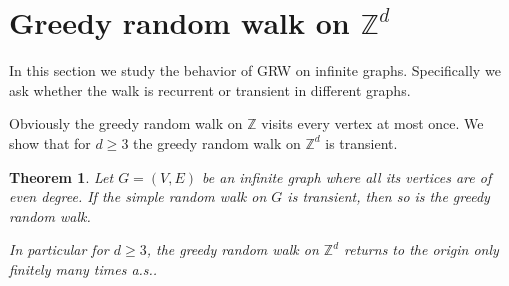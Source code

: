 \documentclass[12pt,a4paper]{article}
\newcommand{\0}{{\bf 0}}
\newcommand{\Z}{{\mathbb Z}}
\newtheorem{theorem}{Theorem}[section]
\begin{document}
\section{Greedy random walk on $\Z^d$}\label{sec:z^d}

    In this section we study the behavior of GRW on infinite graphs.
    Specifically we ask whether the walk is recurrent or transient in different graphs.

    Obviously the greedy random walk on $\Z$ visits every vertex at most once.
    We show that for $d \geq 3$ the greedy random walk on $\Z^d$ is transient.

    \begin{theorem}\label{thm:Z^d}
        Let $G = (V,E)$ be an infinite graph where all its vertices are of even degree.
        If the simple random walk on $G$ is transient, then so is the greedy random walk.

        In particular for $d \geq 3$, the greedy random walk on $\Z^d$ returns to the origin only finitely many times a.s..
    \end{theorem}
\end{document}
